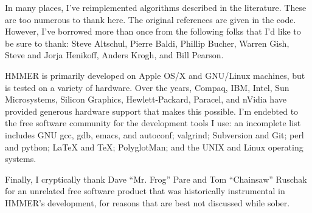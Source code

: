 In many places, I've reimplemented algorithms described in the
literature. These are too numerous to thank here. The original
references are given in the code. However, I've borrowed more than
once from the following folks that I'd like to be sure to thank: Steve
Altschul, Pierre Baldi, Phillip Bucher, Warren Gish, Steve and Jorja
Henikoff, Anders Krogh, and Bill Pearson.

HMMER is primarily developed on Apple OS/X and GNU/Linux machines, but
is tested on a variety of hardware. Over the years, Compaq, IBM,
Intel, Sun Microsystems, Silicon Graphics, Hewlett-Packard, Paracel,
and nVidia have provided generous hardware support that makes this
possible. I'm endebted to the free software community for the
development tools I use: an incomplete list includes GNU gcc, gdb,
emacs, and autoconf; valgrind; Subversion and Git; perl and python;
LaTeX and TeX; PolyglotMan; and the UNIX and Linux operating systems.

Finally, I cryptically thank Dave ``Mr. Frog'' Pare and Tom
``Chainsaw'' Ruschak for an unrelated free software product that was
historically instrumental in HMMER's development, for reasons that are
best not discussed while sober.

\label{manualend}

